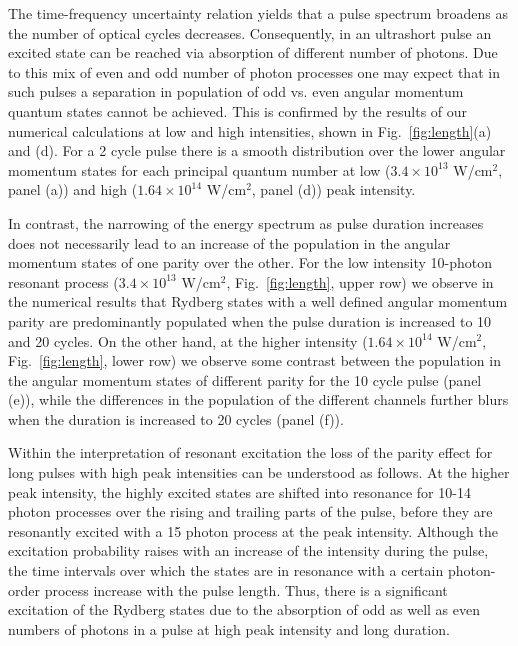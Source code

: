 The time-frequency uncertainty relation yields that a pulse spectrum broadens as the number of optical cycles decreases. Consequently, in an ultrashort pulse an excited state can be reached via absorption of different number of photons. Due to this mix of even and odd number of photon processes one may expect that in such pulses a separation in population of odd vs. even angular momentum quantum states cannot be achieved. This is confirmed by the results of our numerical calculations at low and high intensities, shown in Fig.~\ref{fig:length}(a) and (d). For a 2 cycle pulse there is a smooth distribution over the lower angular momentum states for each principal quantum number at low ($3.4 \times 10^{13}$ W/cm$^2$, panel (a)) and high ($1.64 \times 10^{14}$ W/cm$^2$, panel (d)) peak intensity.   

In contrast, the narrowing of the energy spectrum as pulse duration increases does not necessarily lead to an increase of the population in the angular momentum states of one parity over the other. For the low intensity 10-photon resonant process ($3.4 \times 10^{13}$ W/cm$^2$, Fig.\ \ref{fig:length}, upper row) we observe in the numerical results that Rydberg states with a well defined angular momentum parity are predominantly populated when the pulse duration is increased to 10 and 20 cycles. On the other hand, at the higher intensity ($1.64 \times 10^{14}$ W/cm$^2$, Fig.\ \ref{fig:length}, lower row) we observe some contrast between the population in the angular momentum states of different parity for the 10 cycle pulse (panel (e)), while the differences in the population of the different channels further blurs when the duration is increased to 20 cycles (panel (f)). 

Within the interpretation of resonant excitation the loss of the parity effect for long pulses with high peak intensities can be understood as follows. At the higher peak intensity, the highly excited states are shifted into resonance for 10-14 photon processes over the rising and trailing parts of the pulse, before they are resonantly excited with a 15 photon process at the peak intensity. Although the excitation probability raises with an increase of the intensity during the pulse, the time intervals over which the states are in resonance with a certain photon-order process increase with the pulse length. Thus, there is a significant excitation of the Rydberg states due to the absorption of odd as well as even numbers of photons in a pulse at high peak intensity and long duration. 


